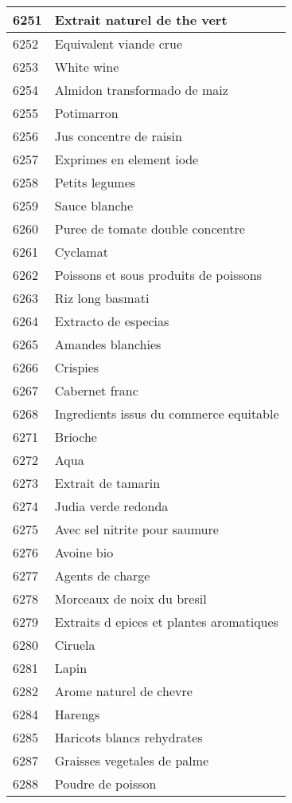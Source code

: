 \begin{longtable}{|l|l|}
6251 & Extrait naturel de the vert \\ \hline 
6252 & Equivalent viande crue \\ \hline 
6253 & White wine \\ \hline 
6254 & Almidon transformado de maiz \\ \hline 
6255 & Potimarron \\ \hline 
6256 & Jus concentre de raisin \\ \hline 
6257 & Exprimes en element iode \\ \hline 
6258 & Petits legumes \\ \hline 
6259 & Sauce blanche \\ \hline 
6260 & Puree de tomate double concentre \\ \hline 
6261 & Cyclamat \\ \hline 
6262 & Poissons et sous produits de poissons \\ \hline 
6263 & Riz long basmati \\ \hline 
6264 & Extracto de especias \\ \hline 
6265 & Amandes blanchies \\ \hline 
6266 & Crispies \\ \hline 
6267 & Cabernet franc \\ \hline 
6268 & Ingredients issus du commerce equitable \\ \hline 
6271 & Brioche \\ \hline 
6272 & Aqua \\ \hline 
6273 & Extrait de tamarin \\ \hline 
6274 & Judia verde redonda \\ \hline 
6275 & Avec sel nitrite pour saumure \\ \hline 
6276 & Avoine bio \\ \hline 
6277 & Agents de charge \\ \hline 
6278 & Morceaux de noix du bresil \\ \hline 
6279 & Extraits d epices et plantes aromatiques \\ \hline 
6280 & Ciruela \\ \hline 
6281 & Lapin \\ \hline 
6282 & Arome naturel de chevre \\ \hline 
6284 & Harengs \\ \hline 
6285 & Haricots blancs rehydrates \\ \hline 
6287 & Graisses vegetales de palme \\ \hline 
6288 & Poudre de poisson \\ \hline 

\end{longtable}
